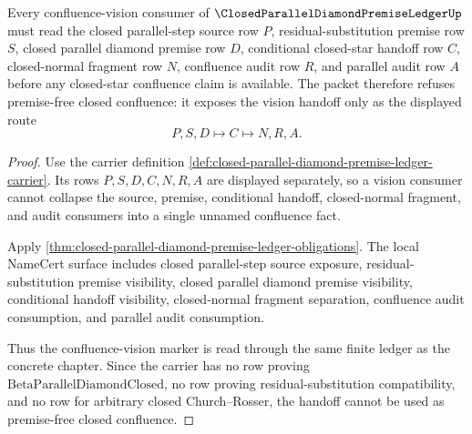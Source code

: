 \begin{theorem}
\label{thm:closed-parallel-diamond-premise-vision-handoff}
Every confluence-vision consumer of $\ClosedParallelDiamondPremiseLedgerUp$ must read the closed parallel-step source row $P$, residual-substitution premise row $S$, closed parallel diamond premise row $D$, conditional closed-star handoff row $C$, closed-normal fragment row $N$, confluence audit row $R$, and parallel audit row $A$ before any closed-star confluence claim is available. The packet therefore refuses premise-free closed confluence: it exposes the vision handoff only as the displayed route
$$
P,S,D \longmapsto C \longmapsto N,R,A .
$$
\end{theorem}
\begin{proof}
Use the carrier definition \autoref{def:closed-parallel-diamond-premise-ledger-carrier}. Its rows $P,S,D,C,N,R,A$ are displayed separately, so a vision consumer cannot collapse the source, premise, conditional handoff, closed-normal fragment, and audit consumers into a single unnamed confluence fact.

Apply \autoref{thm:closed-parallel-diamond-premise-ledger-obligations}. The local NameCert surface includes closed parallel-step source exposure, residual-substitution premise visibility, closed parallel diamond premise visibility, conditional handoff visibility, closed-normal fragment separation, confluence audit consumption, and parallel audit consumption.

Thus the confluence-vision marker is read through the same finite ledger as the concrete chapter. Since the carrier has no row proving $\mathrm{BetaParallelDiamondClosed}$, no row proving residual-substitution compatibility, and no row for arbitrary closed Church--Rosser, the handoff cannot be used as premise-free closed confluence.
\end{proof}



